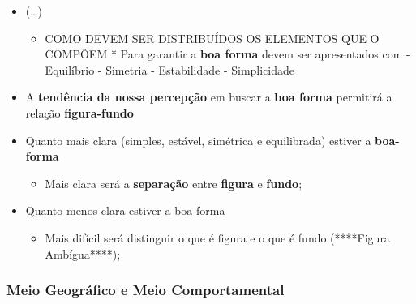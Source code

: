 \documentclass[
]{book}
\providecommand{\tightlist}{%
  \setlength{\itemsep}{0pt}\setlength{\parskip}{0pt}}
\begin{document}
\begin{itemize}
\tightlist
\item
  (\ldots)

  \begin{itemize}
  \tightlist
  \item
    COMO DEVEM SER DISTRIBUÍDOS OS ELEMENTOS QUE O COMPÕEM
    * Para garantir a \textbf{boa forma} devem ser apresentados com
    - Equilíbrio
    - Simetria
    - Estabilidade
    - Simplicidade
  \end{itemize}
\item
  A \textbf{tendência da nossa percepção} em buscar a \textbf{boa forma} permitirá a relação \textbf{figura-fundo}
\item
  Quanto mais clara (simples, estável, simétrica e equilibrada) estiver a \textbf{boa-forma}

  \begin{itemize}
  \tightlist
  \item
    Mais clara será a \textbf{separação} entre \textbf{figura} e \textbf{fundo};
  \end{itemize}
\item
  Quanto menos clara estiver a boa forma

  \begin{itemize}
  \tightlist
  \item
    Mais difícil será distinguir o que é figura e o que é fundo (****Figura Ambígua****);
  \end{itemize}
\end{itemize}

\hypertarget{meio-geogruxe1fico-e-meio-comportamental}{%
\subsubsection{Meio Geográfico e Meio Comportamental}\label{meio-geogruxe1fico-e-meio-comportamental}}
\end{document}
